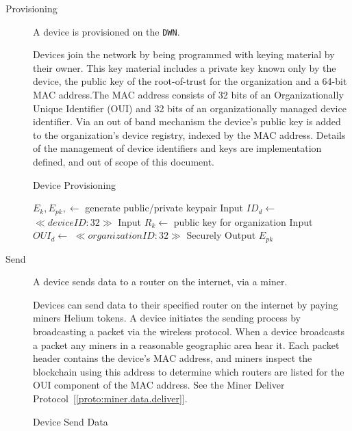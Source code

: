 \documentclass[letterpaper,11pt]{article}
\begin{document}
\begin{description}
  \item [Provisioning] A device is provisioned on the \verb|DWN|.

    Devices join the network by being programmed with keying material by their owner. This key material includes a private key known only by the device, the public key of the root-of-trust for the organization and a 64-bit MAC address.The MAC address consists of 32 bits of an Organizationally Unique Identifier (OUI) and 32 bits of an organizationally managed device identifier. Via an out of band mechanism the device's public key is added to the organization's device registry, indexed by the MAC address. Details of the management of device identifiers and keys are implementation defined, and out of scope of this document.

    \begin{algorithm}[!htb]
      \DontPrintSemicolon
      \caption{Device Provisioning}\label{proto:device.provision}

       {
        $E_k, E_{pk}, \leftarrow $ generate public/private keypair \;
        Input ${ID}_d \leftarrow $ $ \ll device ID:32 \gg $ \;
        Input $R_k \leftarrow $ public key for organization \;
        Input ${OUI}_d \leftarrow $ $ \ll organization ID:32 \gg $ \;
        \BlankLine
        Securely  \;
        \BlankLine
        Output $E_{pk}$ \;
      }
    \end{algorithm}
    \FloatBarrier

  \item [Send] A device sends data to a router on the internet, via a miner.

    Devices can send data to their specified router on the internet by paying miners Helium tokens.
    A device initiates the sending process by broadcasting a packet via the wireless protocol. When a device broadcasts a packet any miners in a reasonable geographic area hear it. Each packet header contains the device's MAC address, and miners inspect the blockchain using this address to determine which routers are listed for the OUI component of the MAC address. See the Miner Deliver Protocol~[\ref{proto:miner.data.deliver}].

    \begin{algorithm}[!htb]
      \DontPrintSemicolon
      \caption{Device Send Data}\label{proto:device.data.send}


\end{algorithm}
\end{description}
\end{document}
